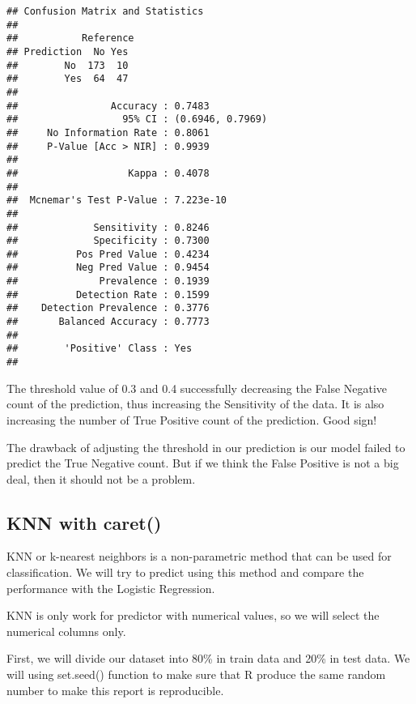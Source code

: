 \documentclass[
]{article}
\begin{document}
\begin{verbatim}
## Confusion Matrix and Statistics
## 
##           Reference
## Prediction  No Yes
##        No  173  10
##        Yes  64  47
##                                           
##                Accuracy : 0.7483          
##                  95% CI : (0.6946, 0.7969)
##     No Information Rate : 0.8061          
##     P-Value [Acc > NIR] : 0.9939          
##                                           
##                   Kappa : 0.4078          
##                                           
##  Mcnemar's Test P-Value : 7.223e-10       
##                                           
##             Sensitivity : 0.8246          
##             Specificity : 0.7300          
##          Pos Pred Value : 0.4234          
##          Neg Pred Value : 0.9454          
##              Prevalence : 0.1939          
##          Detection Rate : 0.1599          
##    Detection Prevalence : 0.3776          
##       Balanced Accuracy : 0.7773          
##                                           
##        'Positive' Class : Yes             
## 
\end{verbatim}

The threshold value of 0.3 and 0.4 successfully decreasing the False
Negative count of the prediction, thus increasing the Sensitivity of the
data. It is also increasing the number of True Positive count of the
prediction. Good sign!

The drawback of adjusting the threshold in our prediction is our model
failed to predict the True Negative count. But if we think the False
Positive is not a big deal, then it should not be a problem.

\hypertarget{knn-with-caret}{%
\subsection{KNN with caret()}\label{knn-with-caret}}

KNN or k-nearest neighbors is a non-parametric method that can be used
for classification. We will try to predict using this method and compare
the performance with the Logistic Regression.

KNN is only work for predictor with numerical values, so we will select
the numerical columns only.

First, we will divide our dataset into 80\% in train data and 20\% in
test data. We will using set.seed() function to make sure that R produce
the same random number to make this report is reproducible.
\end{document}
